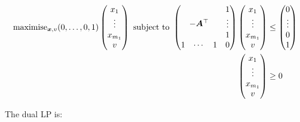 \begin{equation}
	\begin{split}
		\text{maximise}_{\vect{x},v}
		(0,\ldots,0,1) \begin{pmatrix}
			x_1 \\
			\vdots \\
			x_{m_1} \\
			v
		\end{pmatrix}
		\text{ subject to }
		\begin{pmatrix}
			& & & 1 \\
			& & & \vdots  \\
			\multicolumn{3}{c}
			{\raisebox{\dimexpr\normalbaselineskip+.7\ht\strutbox-.5\height}[0pt][0pt]
			{{$-\vect{A}^\top$}}} & 1 \\
			1 & \cdots & 1 & 0
		\end{pmatrix} \begin{pmatrix}
			x_1 \\
			\vdots \\
			x_{m_1} \\
			v
		\end{pmatrix} & \le \begin{pmatrix}
			0 \\
			\vdots \\
			0 \\
			1
		\end{pmatrix} \\
		\begin{pmatrix}
			x_1 \\
			\vdots \\
			x_{m_1} \\
			v
		\end{pmatrix} & \ge 0
	\end{split} 
\end{equation}

The dual LP is:


